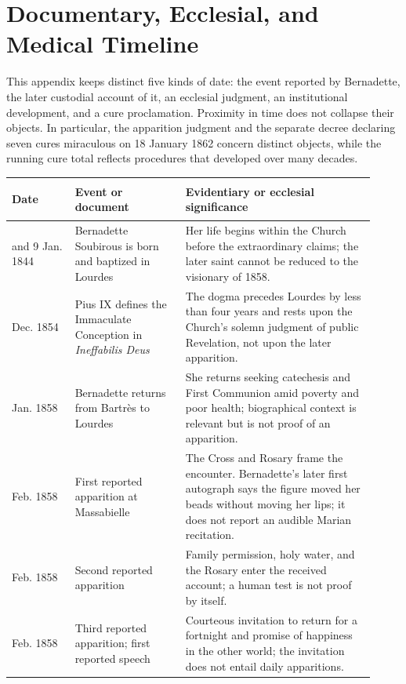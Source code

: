 \section{Documentary, Ecclesial, and Medical Timeline}

This appendix keeps distinct five kinds of date: the event reported by Bernadette, the later custodial account of it, an ecclesial judgment, an institutional development, and a cure proclamation. Proximity in time does not collapse their objects. In particular, the apparition judgment and the separate decree declaring seven cures miraculous on 18 January 1862 concern distinct objects, while the running cure total reflects procedures that developed over many decades.

\begingroup
\footnotesize
\setlength{\LTpre}{0pt}
\begin{longtable}{>{\bfseries\raggedright\arraybackslash}p{0.16\linewidth}>{\raggedright\arraybackslash}p{0.28\linewidth}>{\raggedright\arraybackslash}p{0.48\linewidth}}
\toprule
Date & Event or document & Evidentiary or ecclesial significance\\
\midrule
\endhead
7 and 9 Jan. 1844 & Bernadette Soubirous is born and baptized in Lourdes & Her life begins within the Church before the extraordinary claims; the later saint cannot be reduced to the visionary of 1858.\\
8 Dec. 1854 & Pius IX defines the Immaculate Conception in \emph{Ineffabilis Deus} & The dogma precedes Lourdes by less than four years and rests upon the Church's solemn judgment of public Revelation, not upon the later apparition.\\
21 Jan. 1858 & Bernadette returns from Bartrès to Lourdes & She returns seeking catechesis and First Communion amid poverty and poor health; biographical context is relevant but is not proof of an apparition.\\
11 Feb. 1858 & First reported apparition at Massabielle & The Cross and Rosary frame the encounter. Bernadette's later first autograph says the figure moved her beads without moving her lips; it does not report an audible Marian recitation.\\
14 Feb. 1858 & Second reported apparition & Family permission, holy water, and the Rosary enter the received account; a human test is not proof by itself.\\
18 Feb. 1858 & Third reported apparition; first reported speech & Courteous invitation to return for a fortnight and promise of happiness in the other world; the invitation does not entail daily apparitions.\\

\end{longtable}
